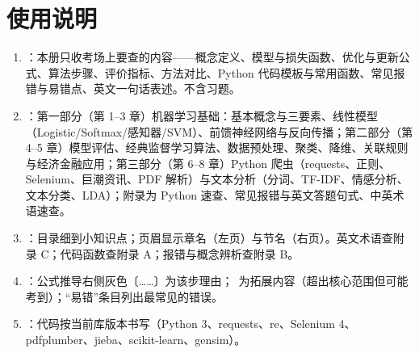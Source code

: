 \chapter*{使用说明}
\begin{enumerate}
\item {}：本册只收考场上要查的内容——概念定义、模型与损失函数、优化与更新公式、算法步骤、评价指标、方法对比、Python 代码模板与常用函数、常见报错与易错点、英文一句话表述。不含习题。
\item {}：第一部分（第 1–3 章）机器学习基础：基本概念与三要素、线性模型（Logistic/Softmax/感知器/SVM）、前馈神经网络与反向传播；第二部分（第 4–5 章）模型评估、经典监督学习算法、数据预处理、聚类、降维、关联规则与经济金融应用；第三部分（第 6–8 章）Python 爬虫（requests、正则、Selenium、巨潮资讯、PDF 解析）与文本分析（分词、TF-IDF、情感分析、文本分类、LDA）；附录为 Python 速查、常见报错与英文答题句式、中英术语速查。
\item {}：目录细到小知识点；页眉显示章名（左页）与节名（右页）。英文术语查附录 C；代码函数查附录 A；报错与概念辨析查附录 B。
\item {}：公式推导右侧灰色〔……〕为该步理由；\tagext\ 为拓展内容（超出核心范围但可能考到）；“易错”条目列出最常见的错误。
\item {}：代码按当前库版本书写（Python 3、requests、re、Selenium 4、pdfplumber、jieba、scikit-learn、gensim）。
\end{enumerate}
